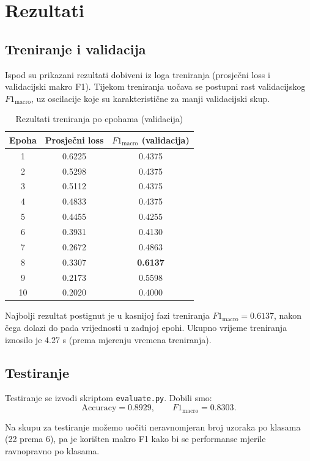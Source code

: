 \documentclass[12pt,a4paper]{article}
\begin{document}
\newpage

\section{Rezultati}

\subsection{Treniranje i validacija}
Ispod su prikazani rezultati dobiveni iz loga treniranja (prosječni loss i validacijski makro F1).
Tijekom treniranja uočava se postupni rast validacijskog $F1_{\mathrm{macro}}$,
uz oscilacije koje su karakteristične za manji validacijski skup.


\begin{table}[h]
\centering
\caption{Rezultati treniranja po epohama (validacija)}
\label{tab:train_results}
\begin{tabular}{ccc}
\toprule
Epoha & Prosječni loss & $F1_{\mathrm{macro}}$ (validacija) \\
\midrule
1  & 0.6225 & 0.4375 \\
2  & 0.5298 & 0.4375 \\
3  & 0.5112 & 0.4375 \\
4  & 0.4833 & 0.4375 \\
5  & 0.4455 & 0.4255 \\
6  & 0.3931 & 0.4130 \\
7  & 0.2672 & 0.4863 \\
8  & 0.3307 & \textbf{0.6137} \\
9  & 0.2173 & 0.5598 \\
10 & 0.2020 & 0.4000 \\
\bottomrule
\end{tabular}
\end{table}

Najbolji rezultat postignut je u kasnijoj fazi treniranja $F1_{\mathrm{macro}}=0.6137$, nakon čega dolazi do pada vrijednosti u zadnjoj epohi. Ukupno vrijeme treniranja
iznosilo je 4.27 s (prema mjerenju vremena treniranja).

\subsection{Testiranje}
Testiranje se izvodi skriptom \texttt{evaluate.py}. Dobili smo:
\[
\text{Accuracy} = 0.8929,\qquad F1_{\mathrm{macro}} = 0.8303.
\]

Na skupu za testiranje možemo uočiti neravnomjeran broj uzoraka po klasama (22 prema 6), pa je korišten
makro F1 kako bi se performanse mjerile ravnopravno po klasama.
\end{document}
